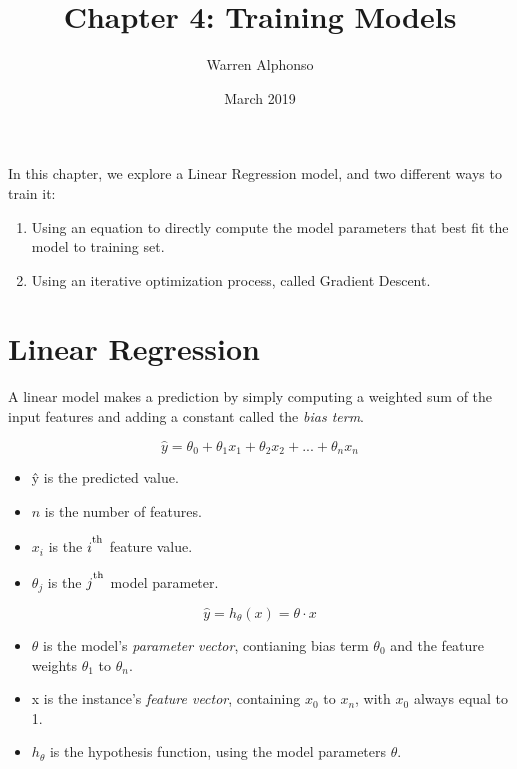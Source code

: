 \documentclass[letterpaper]{article}
\title{Chapter 4: Training Models}
\author{Warren Alphonso}
\date{March 2019}
\begin{document}
\maketitle

In this chapter, we explore a Linear Regression model, and two different ways to train it: 
\begin{enumerate}
	\item Using an equation to directly compute the model parameters that best fit the model to training set. 
	
	\item Using an iterative optimization process, called Gradient Descent.
\end{enumerate}

\section{Linear Regression}
A linear model makes a prediction by simply computing a weighted sum of the input features and adding a constant called the \textsl{bias term}. 

\[ \hat{y} = \theta_{0} + \theta_{1}x_{1} + \theta_{2}x_{2} + ... + \theta_{n}x_{n} \]

\begin{itemize}
	\item \^{y} is the predicted value.
	\item $n$ is the number of features. 
	\item $x_i$ is the $i^\textsuperscript{th}$ feature value. 
	\item $\theta_{j}$ is the $j^\textsuperscript{th}$ model parameter. 
\end{itemize}

\[ \hat{y} = h_{\theta}(x) = \theta \cdot x \]

\begin{itemize}
	\item $\theta$ is the model's \textsl{parameter vector}, contianing bias term $\theta_{0}$ and the feature weights $\theta_{1}$ to $\theta_{n}$. 
	\item x is the instance's \textsl{feature vector}, containing $x_{0}$ to $x_{n}$, with $x_{0}$ always equal to 1. 
	\item $h_{\theta}$ is the hypothesis function, using the model parameters $\theta$. 
\end{itemize}
\end{document}

